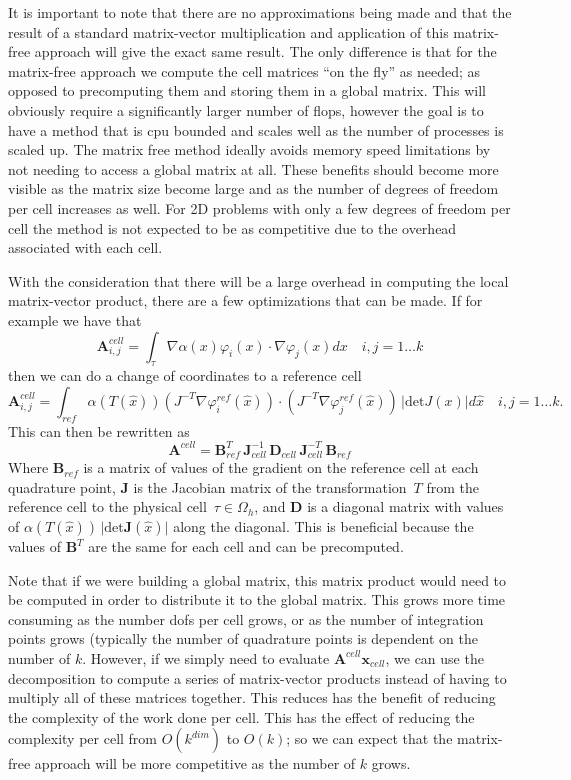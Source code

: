 \documentclass[12pt]{article}
\newcommand{\vect}[1]{\boldsymbol{\mathbf{#1}}}
\newcommand{\dofspercell}{k}
\begin{document}
It is important to note that there are no approximations being made and that the result of a standard matrix-vector multiplication and application of this matrix-free approach will give the exact same result. The only difference is that for the matrix-free approach we compute the cell matrices ``on the fly'' as needed; as opposed to precomputing them and storing them in a global matrix. This will obviously require a significantly larger number of flops, however the goal is to have a method that is cpu bounded and scales well as the number of processes is scaled up. The matrix free method ideally avoids memory speed limitations by not needing to access a global matrix at all. These benefits should become more visible as the matrix size become large and as the number of degrees of freedom per cell increases as well. For 2D problems with only a few degrees of freedom per cell the method is not expected to be as competitive due to the overhead associated with each cell. 

With the consideration that there will be a large overhead in computing the local matrix-vector product, there are a few optimizations that can be made. If for example we have that 
$$\mathbf{A}^{cell}_{i,j} = \int_{\tau}\nabla \alpha(x) \varphi_{i}(x) \cdot \nabla \varphi_{j}(x) dx\quad i,j = 1 \ldots \dofspercell$$ 
then we can do a change of coordinates to a reference cell
$$
	\mathbf{A}^{cell}_{i,j} = \int_{ref} \alpha(T(\hat{x})) (J^{-T}\nabla \varphi_{i}^{ref}(\hat{x})) \cdot (J^{-T}\nabla \varphi_{j}^{ref}(\hat{x}))\,\vert \mathrm{det}J(x) \vert d\hat{x} \quad i,j = 1 \ldots \dofspercell.
$$ 
This can then be rewritten as 
\begin{equation}\label{decomp}
	\mathbf{A}^{cell} = \vect B^{T}_{ref}\,\vect J^{-1}_{cell}\,\vect D_{cell}\,\vect J^{-T}_{cell}\,\vect B_{ref}
\end{equation}
Where $\vect B_{ref}$ is a matrix of values of the gradient on the reference cell at each quadrature point, $\vect J$ is the Jacobian matrix of the transformation~$T$ from the reference cell to the physical cell~$\tau\in\Omega_h$, and $\vect D$ is a diagonal matrix with values of $\alpha(T(\hat{x}))\, \vert \mathrm{det}\vect J(\hat{x}) \vert$ along the diagonal. This is beneficial because the  values of $\vect B^{T}$ are the same for each cell and can be precomputed.

Note that if we were building a global matrix, this matrix product would need to be computed in order to distribute it to the global matrix. This grows more time consuming as the number dofs per cell grows, or as the number of integration points grows (typically the number of quadrature points is dependent on the number of $\dofspercell$. However, if we simply need to evaluate $\vect A^{cell}\vect x_{cell}$, we can use the decomposition to compute a series of matrix-vector products instead of having to multiply all of these matrices together. This reduces has the benefit of reducing the complexity of the work done per cell. This has the effect of reducing the complexity per cell from $O(\dofspercell^{dim})$ to $O(\dofspercell)$; so we can expect that the matrix-free approach will be more competitive as the number of $\dofspercell$ grows.
\end{document}
